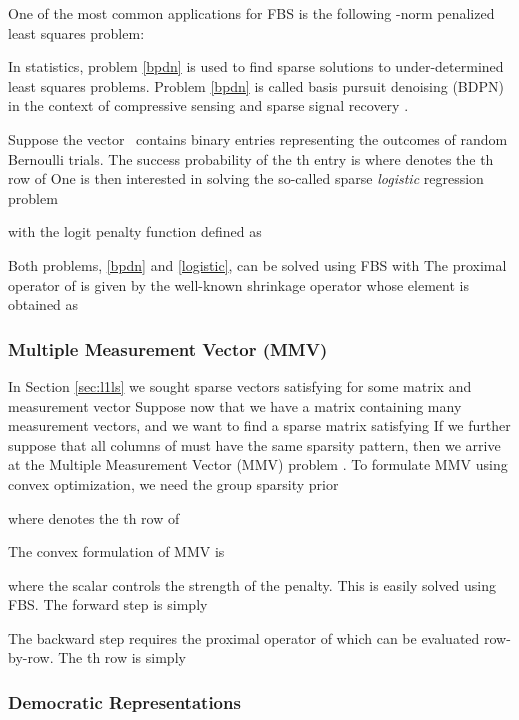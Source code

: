 \documentclass{amsart}
\newcommand{\half}{\frac{1}{2}}
\newcommand{\eqn}[2]{}
\newcommand{\ellone}{}
\DeclareMathOperator*{\minimize}{minimize\quad}
\DeclareMathOperator*{\sign}{sign}
\DeclareMathOperator*{\shrink}{shrink}
\theoremstyle{definition}
\begin{document}
One of the most common applications for FBS is the following \ellone{}-norm penalized least squares problem:
\eqn{bpdn}{
 \minimize  \mu \|x\|_1 + \half \| Ax-b \|^2.
}
In statistics, problem \eqref{bpdn} is used to find sparse solutions to under-determined least squares problems. 
Problem \eqref{bpdn}  is called basis pursuit denoising (BDPN) in the context of compressive sensing and sparse signal recovery  \cite{FNW07,KL10}.

Suppose the vector~ contains binary entries representing the outcomes of random Bernoulli trials.  The success probability of the th entry is 
  where  denotes the th row of 
 One is then interested in solving the so-called sparse \emph{logistic} regression problem
\eqn{logistic}{
 \minimize  \mu \|x\|_1 + \mathrm{logit}(Ax,b)
}
with the logit penalty function defined as 
\eqn{loglink}{
\mathrm{logit}(z,b) =  \sum_{i=1}^{M} \log(e^{z_i}+1)  - b_iz_i. \notag
}

Both problems, \eqref{bpdn} and \eqref{logistic}, can be solved using FBS with   The proximal operator  of  is given by the well-known shrinkage operator  whose  element  is obtained as  
 \eqn{shrink}  {
  \shrink(z,\mu\tau)_i = \shrink(z_i,\mu\tau)=   \sign(z_i) \max\{|z_i|-\mu\tau ,0\}.
  }

 \subsubsection{Multiple Measurement Vector (MMV)}
  In Section \eqref{sec:l1ls} we sought sparse vectors satisfying  for some matrix  and measurement vector   Suppose now that we have a matrix  containing many measurement vectors, and we want to find a sparse matrix  satisfying    If we further suppose that all columns of  must have the same sparsity pattern, then we arrive at the Multiple Measurement Vector (MMV) problem \cite{CREK05}.  To formulate MMV using convex optimization, we  need the group sparsity prior 
    
  where  denotes the th row of 
  
  The convex formulation of MMV is
  
  where the scalar  controls the strength of the penalty.
  This is easily solved using FBS.  The forward step is simply 
   
  The backward step requires the proximal operator of  which can be evaluated row-by-row.  The th row is simply
    


\subsubsection{Democratic Representations}
\end{document}
